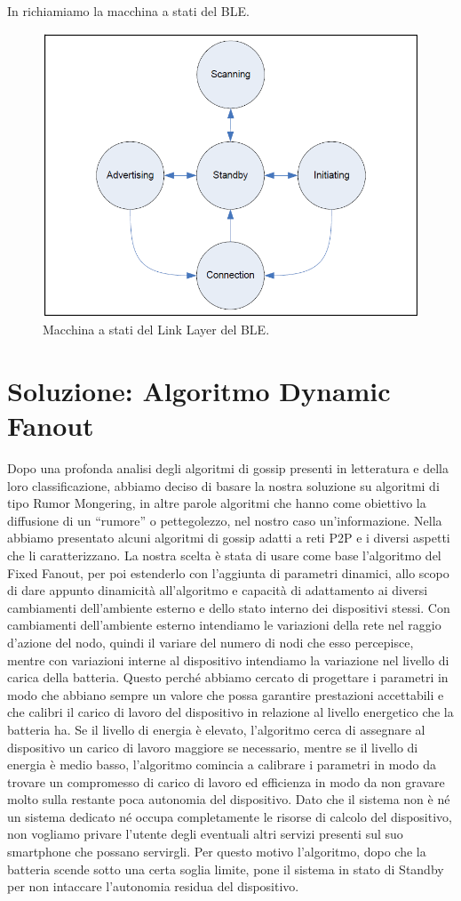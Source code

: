 In  richiamiamo la macchina a stati del BLE.
\begin{figure}[tb]
	\centering
	\includegraphics[width=0.7\linewidth]{Images/bt/bt_fsa}
	\caption[ble fsa]{Macchina a stati del Link Layer del BLE.}
	\label{fig:bt_fsa2}
\end{figure}
\bigskip

\section{Soluzione: Algoritmo Dynamic Fanout}
Dopo una profonda analisi degli algoritmi di gossip presenti in letteratura e della loro classificazione, abbiamo deciso di basare la nostra soluzione su algoritmi di tipo Rumor Mongering, in altre parole algoritmi che hanno come obiettivo la diffusione di un “rumore” o pettegolezzo, nel nostro caso un'informazione. Nella  abbiamo presentato alcuni algoritmi di gossip adatti a reti \acs{P2P} e i diversi aspetti che li caratterizzano. La nostra scelta è stata di usare come base l'algoritmo del Fixed Fanout, per poi estenderlo con l'aggiunta di parametri dinamici, allo scopo di dare appunto dinamicità all'algoritmo e capacità di adattamento ai diversi cambiamenti dell'ambiente esterno e dello stato interno dei dispositivi stessi. Con cambiamenti dell'ambiente esterno intendiamo le variazioni della rete nel raggio d'azione del nodo, quindi il variare del numero di nodi che esso percepisce, mentre con variazioni interne al dispositivo intendiamo la variazione nel livello di carica della batteria. Questo perché abbiamo cercato di progettare i parametri in modo che abbiano sempre un valore che possa garantire prestazioni accettabili e che calibri il carico di lavoro del dispositivo in relazione al livello energetico che la batteria ha. Se il livello di energia è elevato, l'algoritmo cerca di assegnare al dispositivo un carico di lavoro maggiore se necessario, mentre se il livello di energia è medio basso, l'algoritmo comincia a calibrare i parametri in modo da trovare un compromesso di carico di lavoro ed efficienza in modo da non gravare molto sulla restante poca autonomia del dispositivo. Dato che il sistema non è né un sistema dedicato né occupa completamente le risorse di calcolo del dispositivo, non vogliamo privare l'utente degli eventuali altri servizi presenti sul suo smartphone che possano servirgli. Per questo motivo l'algoritmo, dopo che la batteria scende sotto una certa soglia limite, pone il sistema in stato di Standby per non intaccare l'autonomia residua del dispositivo.

